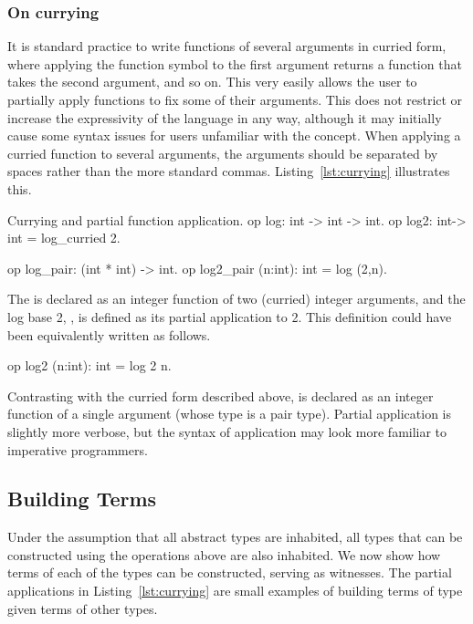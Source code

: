 \subsubsection*{On currying}
It is standard practice to write functions of several arguments in curried form,
where applying the function symbol to the first argument returns a function that
takes the second argument, and so on. This very easily allows the user to
partially apply functions to fix some of their arguments. This does not restrict
or increase the expressivity of the language in any way, although it may
initially cause some syntax issues for users unfamiliar with the concept. When
applying a curried function to several arguments, the arguments should be
separated by spaces rather than the more standard commas.
Listing~\ref{lst:currying} illustrates this.

\begin{easycrypt}[label={lst:currying}]{Currying and partial function application.}
op log: int -> int -> int.
op log2: int-> int = log_curried 2.

op log_pair: (int * int) -> int.
op log2_pair (n:int): int = log (2,n).
\end{easycrypt}

The  is declared as an integer function of two (curried) integer
arguments, and the log base 2, , is defined as its partial
application to 2. This definition could have been equivalently written as
follows.
\begin{easycrypt}[frame=none]{}
op log2 (n:int): int = log 2 n.
\end{easycrypt}
Contrasting with the curried form described above,  is declared
as an integer function of a single argument (whose type is a pair type).
Partial application is slightly more verbose, but the syntax of application may
look more familiar to imperative programmers.

\subsection{Building Terms}
Under the assumption that all abstract types are inhabited, all types that can
be constructed using the operations above are also inhabited. We now show how
terms of each of the types can be constructed, serving as witnesses. The partial
applications in Listing~\ref{lst:currying} are small examples of building terms
of type  given terms of other types.

